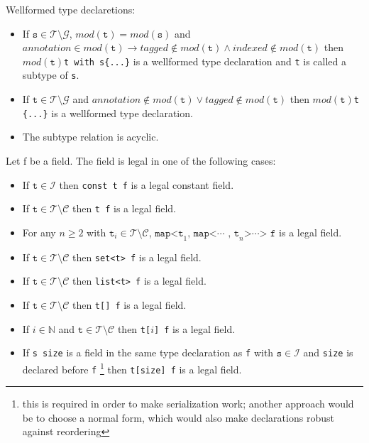 \documentclass[a4paper,10pt]{article}
\begin{document}
Wellformed type declaretions:
\begin{itemize}
 \item If $\texttt{s} \in \mathcal{T}\setminus\mathcal{G}$, $mod(\texttt{t}) = mod(\texttt{s})$ and $annotation \in mod(\texttt{t}) \rightarrow tagged \notin mod(\texttt{t}) \wedge indexed \notin mod(\texttt{t})$ then $mod(\texttt{t})$\verb/t with s{...}/ is a wellformed type declaration and \texttt{t} is called a subtype of \texttt{s}.
 
 \item If $\texttt{t} \in \mathcal{T}\setminus\mathcal{G}$ and $annotation \notin mod(\texttt{t}) \vee tagged \notin mod(\texttt{t})$ then $mod(\texttt{t})$\verb/t {...}/ is a wellformed type declaration.
 
 \item The subtype relation is acyclic.
\end{itemize}


Let f be a field. The field is legal in one of the following cases:
\begin{itemize}
 \item If $\texttt{t} \in \mathcal{I}$ then \verb/const t f/ is a legal constant field.
 
 \item If $\texttt{t} \in \mathcal{T}\setminus\mathcal{C}$ then \verb/t f/ is a legal field.
 
 \item For any $n \geq 2$ with $\texttt{t}_i \in \mathcal{T}\setminus\mathcal{C}$, $\texttt{map<t}_1\texttt{, map<}\cdots\texttt{ , t}_n\texttt{>}\cdots\texttt{> f}$ is a legal field.
 
 \item If $\texttt{t} \in \mathcal{T}\setminus\mathcal{C}$ then \verb/set<t> f/ is a legal field.
 
 \item If $\texttt{t} \in \mathcal{T}\setminus\mathcal{C}$ then \verb/list<t> f/ is a legal field.
 
 \item If $\texttt{t} \in \mathcal{T}\setminus\mathcal{C}$ then \verb/t[] f/ is a legal field.
 
 \item If $i \in \mathbb{N}$ and $\texttt{t} \in \mathcal{T}\setminus\mathcal{C}$ then \verb/t[/$i$\verb/] f/ is a legal field.
 
 \item If \verb/s size/ is a field in the same type declaration as \texttt{f} with $\texttt{s} \in \mathcal{I}$ and \texttt{size} is declared before \texttt{f}
 \footnote{this is required in order to make serialization work; another approach would be to choose a normal form, which would also make declarations robust against reordering} then \verb/t[size] f/ is a legal field.
 
\end{itemize}
\end{document}
